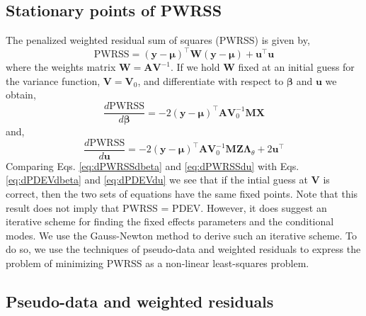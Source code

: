 \documentclass{jss}
\begin{document}
\subsection{Stationary points of PWRSS}

The penalized weighted residual sum of squares (PWRSS) is given by,
\begin{equation}
  \mathrm{PWRSS} = (\bm y-\bm\mu)^\top \bm W (\bm y-\bm\mu) + \bm u^\top
  \bm u
\label{eq:PWRSS}
\end{equation}
where the weights matrix $\bm W = \bm A \bm V^{-1}$. If we hold $\bm
W$ fixed at an initial guess for the variance function, $\bm V = \bm
V_0$, and differentiate with respect to $\bm\beta$ and $\bm u$ we
obtain,
\begin{equation}
  \frac{d \mathrm{PWRSS}}{d \bm\beta} = 
  -2 (\bm y - \bm\mu)^\top \bm A
  \bm V_0^{-1}
  \bm M
  \bm X
\label{eq:dPWRSSdbeta}
\end{equation}
and,
\begin{equation}
  \frac{d \mathrm{PWRSS}}{d \bm u} = 
  -2 (\bm y - \bm\mu)^\top \bm A
  \bm V_0^{-1}
  \bm M
  \bm Z \bm\Lambda_\theta +
  2\bm u^\top
\label{eq:dPWRSSdu}
\end{equation}
Comparing Eqs. \ref{eq:dPWRSSdbeta} and \ref{eq:dPWRSSdu} with
Eqs. \ref{eq:dPDEVdbeta} and \ref{eq:dPDEVdu} we see that if the
intial guess at $\bm V$ is correct, then the two sets of equations
have the same fixed points. Note that this result does not imply that
PWRSS = PDEV. However, it does suggest an iterative scheme for finding
the fixed effects parameters and the conditional modes. We use the
Gauss-Newton method to derive such an iterative scheme. To do so, we
use the techniques of pseudo-data and weighted residuals to express
the problem of minimizing PWRSS as a non-linear least-squares problem.

\subsection{Pseudo-data and weighted residuals}
\end{document}
